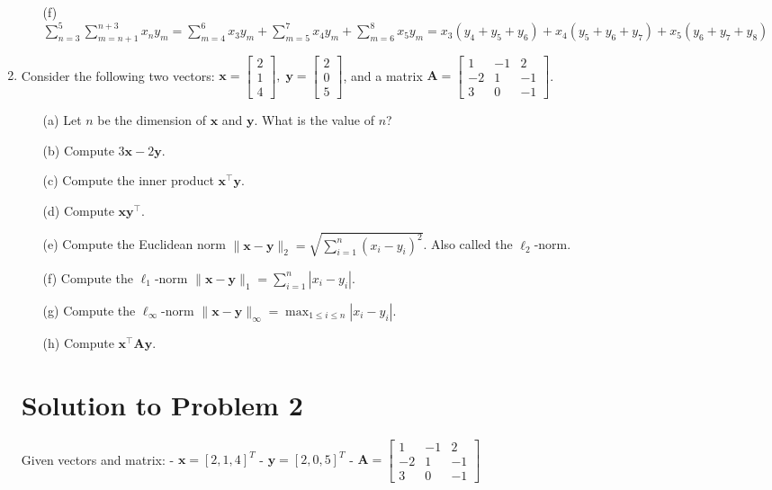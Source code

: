 \documentclass{article}
\def\x{\bm{x}}
\def\y{\bm{y}}
\def\A{\bm{A}}
\def\y{\bm{y}}
\begin{document}
\begin{enumerate}
\begin{enumerate}
\item[(f)] $\sum_{n=3}^5 \sum_{m=n+1}^{n+3} x_ny_m = \sum_{m=4}^6 x_3y_m + \sum_{m=5}^7 x_4y_m + \sum_{m=6}^8 x_5y_m = x_3(y_4 + y_5 + y_6) + x_4(y_5 + y_6 + y_7) + x_5(y_6 + y_7 + y_8)$
\end{enumerate}

\newpage

\item Consider the following two vectors: $ \x = \left[
\begin{array}{c}
2 \\ 1 \\ 4 
\end{array} \right],\; \y = \left[ \begin{array}{c}
2 \\
0 \\
5 \end{array} \right]$, and a matrix $\A = \begin{bmatrix} 1 & -1 & 2 \\ -2 & 1 & -1 \\ 3 & 0 & -1 \end{bmatrix}$.
\begin{itemize}
\item[(a)] Let $n$ be the dimension of $\x$ and $\y$. What is the value of $n$?
\item[(b)] Compute $3\x - 2\y$. 
\item[(c)] Compute the inner product $\x^\top\y$.
\item[(d)] Compute $\x\y^\top$.
\item[(e)] Compute the Euclidean norm $\|\x - \y\|_2 = \sqrt{\sum_{i=1}^n (x_i-y_i)^2}$. Also called the $\ell_2$-norm.
\item[(f)] Compute the $\ell_1$-norm $\|\x - \y\|_1 = {\sum_{i=1}^n |x_i-y_i|}$. 
\item[(g)] Compute the $\ell_\infty$-norm $\|\x - \y\|_\infty = \max_{1\le i\le n} |x_i-y_i|$. 
\item[(h)] Compute $\x^{\top}\A\y$. 
\end{itemize}

\newpage

\section*{Solution to Problem 2}

Given vectors and matrix:
- $\mathbf{x} = [2, 1, 4]^T$
- $\mathbf{y} = [2, 0, 5]^T$
- $\mathbf{A} = \begin{bmatrix} 1 & -1 & 2 \\ -2 & 1 & -1 \\ 3 & 0 & -1 \end{bmatrix}$


\end{enumerate}
\end{document}
